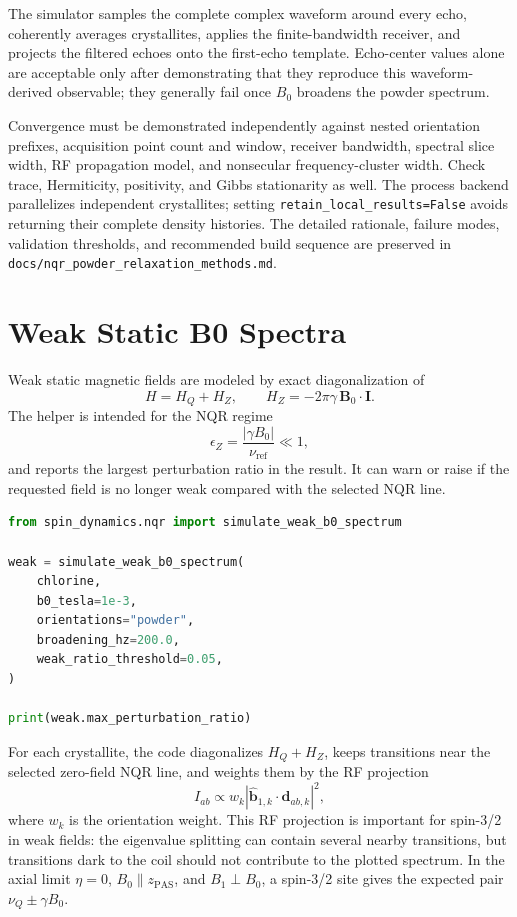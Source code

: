 \documentclass[11pt,oneside]{report}
\newcommand{\code}[1]{\texttt{#1}}
\begin{document}
The simulator samples the complete complex waveform around every echo,
coherently averages crystallites, applies the finite-bandwidth receiver, and
projects the filtered echoes onto the first-echo template. Echo-center values
alone are acceptable only after demonstrating that they reproduce this
waveform-derived observable; they generally fail once \(B_0\) broadens the
powder spectrum.

Convergence must be demonstrated independently against nested orientation
prefixes, acquisition point count and window, receiver bandwidth, spectral
slice width, RF propagation model, and nonsecular frequency-cluster width.
Check trace, Hermiticity, positivity, and Gibbs stationarity as well. The
process backend parallelizes independent crystallites; setting
\code{retain\_local\_results=False} avoids returning their complete density
histories. The detailed rationale, failure modes, validation thresholds, and
recommended build sequence are preserved in
\code{docs/nqr\_powder\_relaxation\_methods.md}.

\section{Weak Static B0 Spectra}

Weak static magnetic fields are modeled by exact diagonalization of
\[
  H = H_Q + H_Z, \qquad
  H_Z = -2\pi\gamma\,\mathbf{B}_0\cdot\mathbf{I}.
\]
The helper is intended for the NQR regime
\[
  \epsilon_Z = \frac{|\gamma B_0|}{\nu_{\mathrm{ref}}} \ll 1,
\]
and reports the largest perturbation ratio in the result. It can warn or raise
if the requested field is no longer weak compared with the selected NQR line.

\begin{lstlisting}[language=Python]
from spin_dynamics.nqr import simulate_weak_b0_spectrum

weak = simulate_weak_b0_spectrum(
    chlorine,
    b0_tesla=1e-3,
    orientations="powder",
    broadening_hz=200.0,
    weak_ratio_threshold=0.05,
)

print(weak.max_perturbation_ratio)
\end{lstlisting}

For each crystallite, the code diagonalizes \(H_Q+H_Z\), keeps transitions
near the selected zero-field NQR line, and weights them by the RF projection
\[
  I_{ab} \propto w_k
  \left|\hat{\mathbf{b}}_{1,k}\cdot\mathbf{d}_{ab,k}\right|^2,
\]
where \(w_k\) is the orientation weight. This RF projection is important for
spin-3/2 in weak fields: the eigenvalue splitting can contain several nearby
transitions, but transitions dark to the coil should not contribute to the
plotted spectrum. In the axial limit \(\eta=0\), \(B_0\parallel z_{\mathrm{PAS}}\),
and \(B_1\perp B_0\), a spin-3/2 site gives the expected pair
\(\nu_Q\pm\gamma B_0\).
\end{document}
